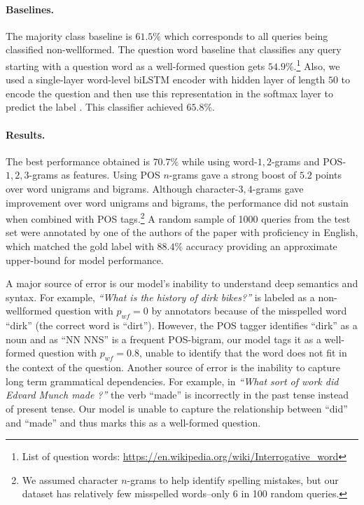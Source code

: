 \documentclass[11pt,a4paper]{article}
\begin{document}
\paragraph{Baselines.} The majority class baseline is $61.5\%$ which corresponds to all
queries being classified non-wellformed. The question word baseline that classifies any
query starting with a question word as a well-formed question gets
$54.9\%$.\footnote{List of question words: \url{https://en.wikipedia.org/wiki/Interrogative_word}} Also, we
used a single-layer word-level biLSTM encoder with hidden layer of length $50$
to encode the question and then use this representation in the softmax layer to
predict the label \cite{lee-dernoncourt:2016:N16-1}. This classifier achieved
$65.8\%$.

\paragraph{Results.} The best performance obtained is $70.7\%$ while
using word-$1,2$-grams and POS-$1,2,3$-grams as features. Using
POS $n$-grams gave a strong boost of $5.2$ points over word unigrams and bigrams.
Although character-$3,4$-grams gave improvement over word unigrams and bigrams,
the performance did not sustain when combined with POS tags.\footnote{We
assumed character $n$-grams to help identify spelling mistakes, but our dataset
has relatively few misspelled words--only 6 in 100 random queries.} A random sample of
1000 queries from the test set were annotated by one of the authors
of the paper with proficiency in English, which matched the gold label with
$88.4\%$ accuracy providing an approximate upper-bound for model performance.

A major source of error is our model's inability to understand deep semantics and syntax.
For example, \textit{``What is the history of dirk bikes?''} is labeled as a non-wellformed
question with $p_{wf}=0$ by annotators because of the misspelled word ``dirk'' (the correct 
word is ``dirt''). However, the POS tagger identifies ``dirk'' as a noun and as ``NN NNS'' 
is a frequent POS-bigram, our model tags it as a well-formed question with $p_{wf}=0.8$,
unable to identify that the word does not fit in the context of the question.
Another source of error is the inability to capture long term grammatical dependencies. For
example, in \textit{``What sort of work did Edvard Munch made ?''} the verb ``made'' is
incorrectly in the past tense instead of present tense. Our model is unable to capture
the relationship between ``did'' and ``made'' and thus marks this as a well-formed
question.
\end{document}
